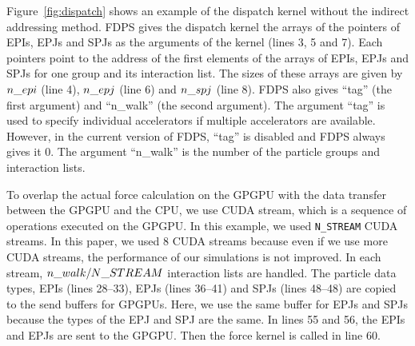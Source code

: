\documentclass[dvipdfmx]{pasj01}
\begin{document}
Figure~\ref{fig:dispatch} shows an example of the dispatch kernel
without the indirect addressing method. FDPS gives the dispatch kernel
the arrays of the pointers of EPIs, EPJs and SPJs as the arguments of
the kernel (lines 3, 5 and 7). Each pointers point to the address of
the first elements of the arrays of EPIs, EPJs and SPJs for one group
and its interaction list.  The sizes of these arrays are given by
${\rm n\_epi}$ (line 4), ${\rm n\_epj}$ (line 6) and ${\rm n\_spj}$
(line 8). FDPS also gives ``tag'' (the first argument) and ``n\_walk''
(the second argument). The argument ``tag'' is used to specify
individual accelerators if multiple accelerators are
available. However, in the current version of FDPS, ``tag'' is
disabled and FDPS always gives it 0. The argument ``n\_walk'' is the
number of the particle groups and interaction lists.

To overlap the actual force calculation on the GPGPU with the data
transfer between the GPGPU and the CPU, we use CUDA stream, which is a
sequence of operations executed on the GPGPU. In this example, we used
{\tt N\_STREAM} CUDA streams. In this paper, we used 8 CUDA streams
because even if we use more CUDA streams, the performance of our
simulations is not improved. In each stream, ${\rm n\_walk /
  N\_STREAM}$ interaction lists are handled. The particle data types,
EPIs (lines 28--33), EPJs (lines 36--41) and SPJs (lines 48--48) are
copied to the send buffers for GPGPUs. Here, we use the same buffer
for EPJs and SPJs because the types of the EPJ and SPJ are the
same. In lines 55 and 56, the EPIs and EPJs are sent to the
GPGPU. Then the force kernel is called in line 60.
\end{document}
